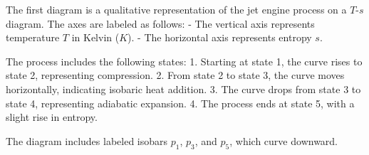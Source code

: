 The first diagram is a qualitative representation of the jet engine process on a \( T \)-\( s \) diagram. The axes are labeled as follows:  
- The vertical axis represents temperature \( T \) in Kelvin (\( K \)).  
- The horizontal axis represents entropy \( s \).  

The process includes the following states:  
1. Starting at state 1, the curve rises to state 2, representing compression.  
2. From state 2 to state 3, the curve moves horizontally, indicating isobaric heat addition.  
3. The curve drops from state 3 to state 4, representing adiabatic expansion.  
4. The process ends at state 5, with a slight rise in entropy.  

The diagram includes labeled isobars \( p_1 \), \( p_3 \), and \( p_5 \), which curve downward.
